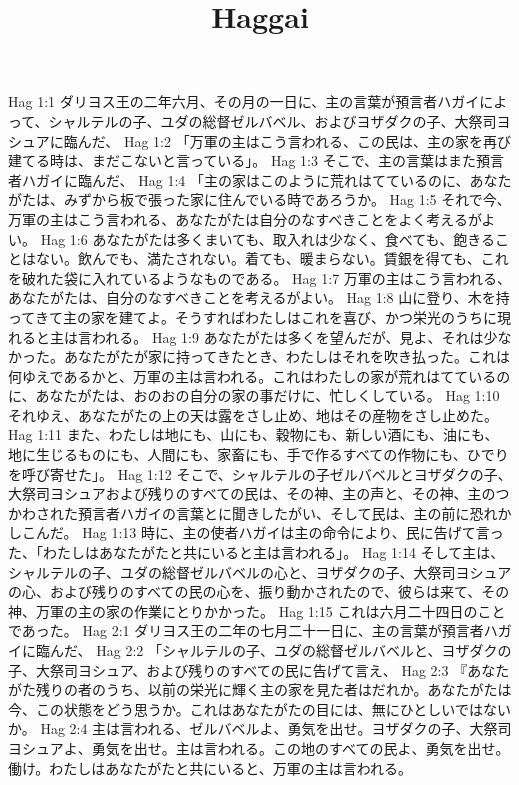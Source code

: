 

\title{Haggai}

Hag 1:1  ダリヨス王の二年六月、その月の一日に、主の言葉が預言者ハガイによって、シャルテルの子、ユダの総督ゼルバベル、およびヨザダクの子、大祭司ヨシュアに臨んだ、
Hag 1:2  「万軍の主はこう言われる、この民は、主の家を再び建てる時は、まだこないと言っている」。
Hag 1:3  そこで、主の言葉はまた預言者ハガイに臨んだ、
Hag 1:4  「主の家はこのように荒れはてているのに、あなたがたは、みずから板で張った家に住んでいる時であろうか。
Hag 1:5  それで今、万軍の主はこう言われる、あなたがたは自分のなすべきことをよく考えるがよい。
Hag 1:6  あなたがたは多くまいても、取入れは少なく、食べても、飽きることはない。飲んでも、満たされない。着ても、暖まらない。賃銀を得ても、これを破れた袋に入れているようなものである。
Hag 1:7  万軍の主はこう言われる、あなたがたは、自分のなすべきことを考えるがよい。
Hag 1:8  山に登り、木を持ってきて主の家を建てよ。そうすればわたしはこれを喜び、かつ栄光のうちに現れると主は言われる。
Hag 1:9  あなたがたは多くを望んだが、見よ、それは少なかった。あなたがたが家に持ってきたとき、わたしはそれを吹き払った。これは何ゆえであるかと、万軍の主は言われる。これはわたしの家が荒れはてているのに、あなたがたは、おのおの自分の家の事だけに、忙しくしている。
Hag 1:10  それゆえ、あなたがたの上の天は露をさし止め、地はその産物をさし止めた。
Hag 1:11  また、わたしは地にも、山にも、穀物にも、新しい酒にも、油にも、地に生じるものにも、人間にも、家畜にも、手で作るすべての作物にも、ひでりを呼び寄せた」。
Hag 1:12  そこで、シャルテルの子ゼルバベルとヨザダクの子、大祭司ヨシュアおよび残りのすべての民は、その神、主の声と、その神、主のつかわされた預言者ハガイの言葉とに聞きしたがい、そして民は、主の前に恐れかしこんだ。
Hag 1:13  時に、主の使者ハガイは主の命令により、民に告げて言った、「わたしはあなたがたと共にいると主は言われる」。
Hag 1:14  そして主は、シャルテルの子、ユダの総督ゼルバベルの心と、ヨザダクの子、大祭司ヨシュアの心、および残りのすべての民の心を、振り動かされたので、彼らは来て、その神、万軍の主の家の作業にとりかかった。
Hag 1:15  これは六月二十四日のことであった。
Hag 2:1  ダリヨス王の二年の七月二十一日に、主の言葉が預言者ハガイに臨んだ、
Hag 2:2  「シャルテルの子、ユダの総督ゼルバベルと、ヨザダクの子、大祭司ヨシュア、および残りのすべての民に告げて言え、
Hag 2:3  『あなたがた残りの者のうち、以前の栄光に輝く主の家を見た者はだれか。あなたがたは今、この状態をどう思うか。これはあなたがたの目には、無にひとしいではないか。
Hag 2:4  主は言われる、ゼルバベルよ、勇気を出せ。ヨザダクの子、大祭司ヨシュアよ、勇気を出せ。主は言われる。この地のすべての民よ、勇気を出せ。働け。わたしはあなたがたと共にいると、万軍の主は言われる。

